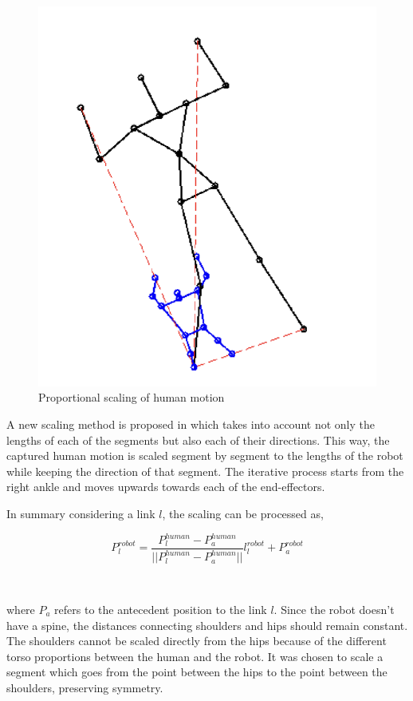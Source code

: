 \begin{figure}[h!]
    \centering
    \includegraphics[scale=0.7]{images/proportional-scaling.png}\hfill
    \caption{Proportional scaling of human motion \cite{louisepouble}}\hfill
    \label{fig: proportional scaling}
\end{figure}

A new scaling method is proposed in \cite{sakka:hal-01054887} which takes into account not only the
lengths of each of the segments but also each of their directions. This way, the captured
human motion is scaled segment by segment to the lengths of the robot while keeping the 
direction of that segment. The iterative process starts from the right ankle and moves upwards towards each of the end-effectors.

In summary considering a link $l$, the scaling can be processed as,

\begin{equation}
    P_l^{robot} = \frac{P_l^{human} - P_a^{human}}{||P_l^{human} - P_a^{human}||}l_l^{robot} + P_a^{robot}
\end{equation}

~

where $P_a$ refers to the antecedent position to the link $l$. Since the robot doesn’t have a spine, the distances connecting shoulders and hips 
should remain constant. The shoulders cannot be scaled directly from the hips because of the different torso proportions between the human and the 
robot. It was chosen to scale a segment which goes from the point between the hips to the point between the shoulders, preserving symmetry.